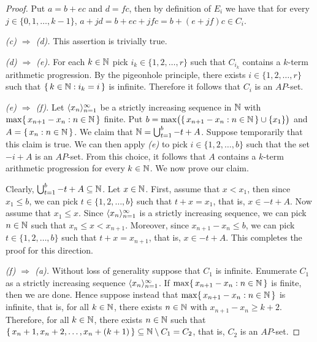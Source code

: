 \begin{proof}
  Put $a = b+ec$ and $d = fc$, then by definition of $E_i$ we have that for every $j \in \{0, 1, \ldots, k-1\}$, $a + jd = b + ec + jfc = b+(e+jf)c \in C_i$.
  
  
  \textsl{(c) $\Rightarrow$ (d).}
  This assertion is trivially true.

  \textsl{(d) $\Rightarrow$ (e).}
  For each $k \in \mathbb{N}$ pick $i_k \in \{1, 2, \ldots, r\}$ such that $C_{i_k}$ contains a $k$-term arithmetic progression. 
  By the pigeonhole principle, there exists $i \in \{1, 2, \ldots, r\}$ such that $\{\,k \in \mathbb{N} : i_k = i\,\}$ is infinite.
  Therefore it follows that $C_i$ is an $AP$-set.

  \textsl{(e) $\Rightarrow$ (f).}
  Let $\langle x_n \rangle_{n=1}^\infty$ be a strictly increasing sequence in $\mathbb{N}$ with $\max\{\, x_{n+1} - x_n : n \in \mathbb{N} \,\}$ finite. 
  Put $b =\max\bigl(\{\, x_{n+1} - x_n : n \in \mathbb{N} \,\} \cup \{x_1\}\bigr)$ and $A = \{\, x_n : n \in \mathbb{N} \,\}$. 
  We claim that $\mathbb{N} = \bigcup_{t=1}^b -t+A$. 
  Suppose temporarily that this claim is true.
  We can then apply \textsl{(e)} to pick $i \in \{1, 2, \ldots, b\}$ such that the set $-i + A$ is an $AP$-set. 
  From this choice, it follows that $A$ contains a $k$-term arithmetic progression for every $k \in \mathbb{N}$. 
  We now prove our claim.
  
  Clearly, $\bigcup_{t=1}^b -t+A \subseteq \mathbb{N}$.
  Let $x \in \mathbb{N}$.
  First, assume that $x < x_1$, then since $x_1 \le b$, we can pick $t \in \{1, 2, \ldots, b\}$ such that $t + x = x_1$, that is, $x \in -t+A$.
  Now assume that $x_1 \le x$.
  Since $\langle x_n \rangle_{n=1}^\infty$ is a strictly increasing sequence, we can pick $n \in \mathbb{N}$ such that $x_n \le x < x_{n+1}$.
  Moreover, since $x_{n+1} - x_n \le b$, we can pick $t \in \{1, 2, \ldots, b\}$ such that $t + x = x_{n+1}$, that is, $x \in -t + A$. 
  This completes the proof for this direction. 

  \textsl{(f) $\Rightarrow$ (a).}
  Without loss of generality suppose that $C_1$ is infinite.
  Enumerate $C_1$ as a strictly increasing sequence $\langle x_n \rangle_{n=1}^\infty$. 
  If $\max\{\, x_{n+1} - x_n : n \in \mathbb{N} \,\}$ is finite, then we are done. 
  Hence suppose instead that $\max\{\, x_{n+1} - x_n : n \in \mathbb{N} \,\}$ is infinite, that is, for all $k \in \mathbb{N}$, there exists $n \in \mathbb{N}$ with $x_{n+1} - x_n \ge k + 2$. 
  Therefore, for all $k \in \mathbb{N}$, there exists $n \in \mathbb{N}$ such that $\{\, x_n + 1, x_n + 2, \ldots, x_n + (k + 1) \,\} \subseteq \mathbb{N} \setminus C_1 = C_2$, that is, $C_2$ is an $AP$-set.
\end{proof}

